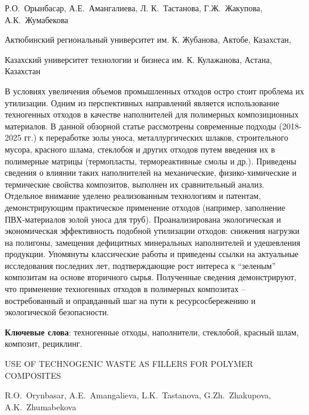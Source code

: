 
\begin{header}

Р.О.~Орынбасар,
А.Е.~Амангалиева\envelope,
Л. К.~Тастанова,
Г.Ж.~Жакупова,
А.К.~Жумабекова
\end{header}

\begin{affil}
Актюбинский региональный университет им. К. Жубанова, Актобе, Казахстан,

Казахский университет технологии и бизнеса им. К. Кулажанова, Астана, Казахстан

\end{affil}

В условиях увеличения объемов промышленных отходов остро стоит проблема
их утилизации. Одним из перспективных направлений является использование
техногенных отходов в качестве наполнителей для полимерных
композиционных материалов. В данной обзорной статье рассмотрены
современные подходы (2018-2025 гг.) к переработке золы уноса,
металлургических шлаков, строительного мусора, красного шлама, стеклобоя
и других отходов путем введения их в полимерные матрицы (термопласты,
термореактивные смолы и др.). Приведены сведения о влиянии таких
наполнителей на механические, физико-химические и термические свойства
композитов, выполнен их сравнительный анализ. Отдельное внимание уделено
реализованным технологиям и патентам, демонстрирующим практическое
применение отходов (например, заполнение ПВХ-материалов золой уноса для
труб). Проанализирована экологическая и экономическая эффективность
подобной утилизации отходов: снижения нагрузки на полигоны, замещения
дефицитных минеральных наполнителей и удешевления продукции. Упомянуты
классические работы и приведены ссылки на актуальные исследования
последних лет, подтверждающие рост интереса к ``зеленым'' композитам на
основе вторичного сырья. Полученные сведения демонстрируют, что
применение техногенных отходов в полимерных композитах -- востребованный
и оправданный шаг на пути к ресурсосбережению и экологической
безопасности.

{\bfseries Ключевые слова}: техногенные отходы, наполнители, стеклобой,
красный шлам, композит, рециклинг.

\begin{header}
USE OF TECHNOGENIC WASTE AS FILLERS FOR POLYMER COMPOSITES

R.O.~Orynbasar,
A.E.~Amangalieva\envelope,
L.K.~Tastanova,
G.Zh.~Zhakupova,
A.K.~Zhumabekova
\end{header}

